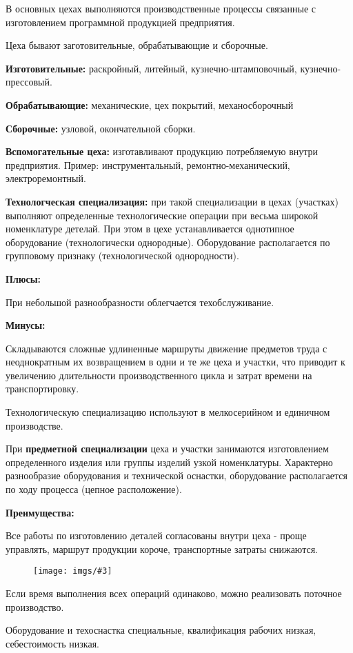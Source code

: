 \documentclass[14pt,a4paper,oneside]{extarticle}
\newcommand{\pic}[3]{
	\begin{figure}[#1]
		\begin{center}
			\texttt{[image: imgs/\#3]}
		\end{center}
	\end{figure}
}
\begin{document}
В основных цехах выполняются производственные процессы связанные с изготовлением программной продукцией предприятия.

Цеха бывают заготовительные, обрабатывающие и сборочные.

\textbf{Изготовительные:} раскройный, литейный, кузнечно-штамповочный, кузнечно-прессовый.

\textbf{Обрабатывающие:} механические, цех покрытий, механосборочный

\textbf{Сборочные:} узловой, окончательной сборки.

\textbf{Вспомогательные цеха:} изготавливают продукцию потребляемую внутри предприятия. Пример: инструментальный, ремонтно-механический, электроремонтный.

\textbf{Технологческая специализация:} при такой специализации в цехах (участках) выполняют определенные технологические операции при весьма широкой номенклатуре детелай. При этом в цехе устанавливается однотипное оборудование (технологически однородные). Оборудование располагается по групповому признаку (технологической однородности).

\textbf{Плюсы:}

При небольшой разнообразности облегчается техобслуживание.

\textbf{Минусы:}

Складываются сложные удлиненные маршруты движение предметов труда с неоднократным их возвращением в одни и те же цеха и участки, что приводит к увеличению длительности производственного цикла и затрат времени на транспортировку.

Технологическую специализацию используют в мелкосерийном и единичном производстве.

При \textbf{предметной специализации} цеха и участки занимаются изготовлением определенного изделия или группы изделий узкой номенклатуры. Характерно разнообразие оборудования и технической оснастки, оборудование располагается по ходу процесса (цепное расположение).

\textbf{Преимущества:} 

Все работы по изготовлению деталей согласованы внутри цеха - проще управлять, маршрут продукции короче, транспортные затраты снижаются.

\pic{H}{\textwidth}{17}

Если время выполнения всех операций одинаково, можно реализовать поточное производство.

Оборудование и техоснастка специальные, квалификация рабочих низкая, себестоимость низкая.
\end{document}
